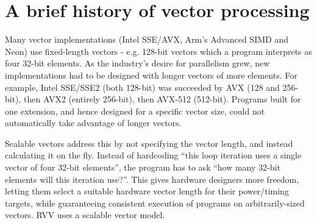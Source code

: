\section{A brief history of vector processing}\label{chap:bg:rvvstart}
Many vector implementations (Intel SSE/AVX, Arm's Advanced SIMD and Neon) use fixed-length vectors - e.g. 128-bit vectors which a program interprets as four 32-bit elements.
As the industry's desire for parallelism grew, new implementations had to be designed with longer vectors of more elements.
For example, Intel SSE/SSE2 (both 128-bit) was succeeded by AVX (128 and 256-bit), then AVX2 (entirely 256-bit), then AVX-512 (512-bit).
Programs built for one extension, and hence designed for a specific vector size, could not automatically take advantage of longer vectors.

Scalable vectors address this by not specifying the vector length, and instead calculating it on the fly.
Instead of hardcoding \enquote{this loop iteration uses a single vector of four 32-bit elements}, the program has to ask \enquote{how many 32-bit elements will this iteration use?}.
This gives hardware designers more freedom, letting them select a suitable hardware vector length for their power/timing targets, while guaranteeing consistent execution of programs on arbitrarily-sized vectors.
RVV uses a scalable vector model.
